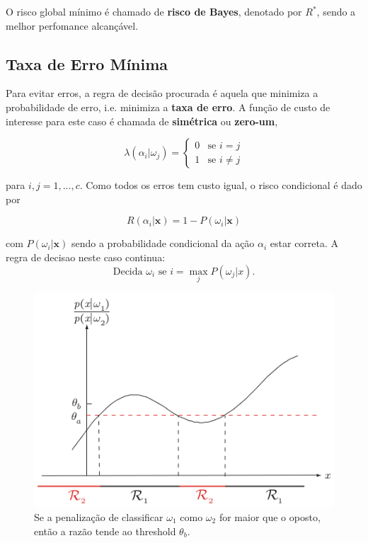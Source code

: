 \documentclass[a4paper,12pt,twocolumn]{article}
\newcommand{\twopartdef}[4]
{
    \left\{
        \begin{array}{ll}
            #1 & \mbox{se } #2 \\
            #3 & \mbox{se } #4
        \end{array}
    \right.
}
\begin{document}
O risco global mínimo é chamado de \textbf{risco de Bayes}, denotado por $R^*$, sendo a melhor perfomance alcançável.

\subsection{Taxa de Erro Mínima}

Para evitar erros, a regra de decisão procurada é aquela que minimiza a probabilidade de erro, i.e. minimiza a \textbf{taxa de erro}. A função de custo de interesse para este caso é chamada de \textbf{simétrica} ou \textbf{zero-um},

\begin{equation}
    \lambda(\alpha_i|\omega_j) = \twopartdef{0}{i=j}{1}{i \neq j}
    \label{eq:loss_zero_one}
\end{equation}

\noindent para $i, j = 1, ..., c$. Como todos os erros tem custo igual, o risco condicional é dado por

\begin{equation}
    R(\alpha_i|\boldsymbol{x}) = 1 - P(\omega_i|\boldsymbol{x})
    \label{eq:conditional_risk_zero_one}
\end{equation}

\noindent com $P(\omega_i|\boldsymbol{x})$ sendo a probabilidade condicional da ação $\alpha_i$ estar correta. A regra de decisao neste caso continua:
\begin{equation}
    \text{Decida } \omega_i \text{ se } i = \max_j P(\omega_j|x).
    \label{eq:decision_4}
\end{equation}

\begin{figure}[ht]
    \centering
    \includegraphics[scale=0.5]{decision_region}
    \caption{Se a penalização de classificar $\omega_1$ como $\omega_2$ for maior que o oposto, então a razão tende ao threshold $\theta_b$.}
    \label{fig:decision_region}
\end{figure}
\end{document}
